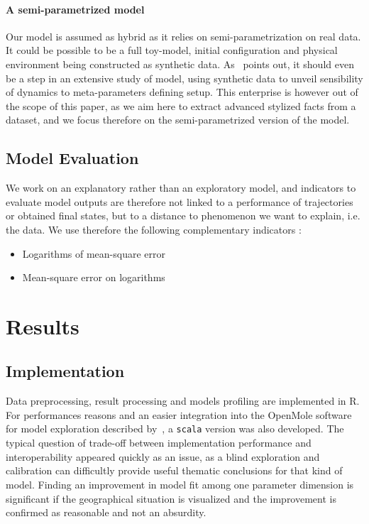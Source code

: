 \documentclass[Royal,sageh,times]{sagej}
\begin{document}
\paragraph{A semi-parametrized model}

Our model is assumed as hybrid as it relies on semi-parametrization on real data. It could be possible to be a full toy-model, initial configuration and physical environment being constructed as synthetic data. As~\cite{raimbault2016generation} points out, it should even be a step in an extensive study of model, using synthetic data to unveil sensibility of dynamics to meta-parameters defining setup. This enterprise is however out of the scope of this paper, as we aim here to extract advanced stylized facts from a dataset, and we focus therefore on the semi-parametrized version of the model.



\subsection*{Model Evaluation}

We work on an explanatory rather than an exploratory model, and indicators to evaluate model outputs are therefore not linked to a performance of trajectories or obtained final states, but to a distance to phenomenon we want to explain, i.e. the data. We use therefore the following complementary indicators :

\begin{itemize}
\item Logarithms of mean-square error
\item Mean-square error on logarithms
\end{itemize}







\section*{Results}



\subsection*{Implementation}

Data preprocessing, result processing and models profiling are implemented in R. For performances reasons and an easier integration into the OpenMole software for model exploration described by~\cite{reuillon2013openmole}, a \texttt{scala} version was also developed. The typical question of trade-off between implementation performance and interoperability appeared quickly as an issue, as a blind exploration and calibration can difficultly provide useful thematic conclusions for that kind of model. Finding an improvement in model fit among one parameter dimension is significant if the geographical situation is visualized and the improvement is confirmed as reasonable and not an absurdity.
\end{document}
